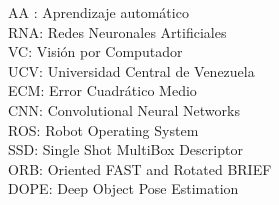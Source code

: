 AA : Aprendizaje automático \\
RNA: Redes Neuronales Artificiales \\
VC: Visión por Computador\\
UCV: Universidad Central de Venezuela\\
ECM: Error Cuadrático Medio \\
CNN: Convolutional Neural Networks\\
ROS: Robot Operating System\\
SSD: Single Shot MultiBox Descriptor\\
ORB: Oriented FAST and Rotated BRIEF\\
DOPE: Deep Object Pose Estimation \\

